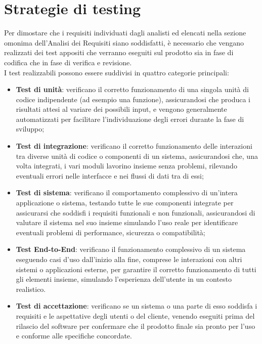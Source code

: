 \section{Strategie di testing}
Per dimostare che i requisiti individuati dagli analisti ed elencati nella sezione omonima dell'Analisi dei Requisiti siano soddisfatti, è necessario che vengano realizzati dei test appositi che verranno eseguiti sul prodotto sia in fase di codifica che in fase di verifica e revisione.\\
I test realizzabili possono essere suddivisi in quattro categorie principali:
\begin{itemize}
    \item \textbf{Test di unità}: verificano il corretto funzionamento di una singola unità di codice indipendente (ad esempio una funzione), assicurandosi che produca i risultati attesi al variare dei possibili input, e vengono generalmente automatizzati per facilitare l'individuazione degli errori durante la fase di sviluppo;
    \item \textbf{Test di integrazione}: verificano il corretto funzionamento delle interazioni tra diverse unità di codice o componenti di un sistema, assicurandosi che, una volta integrati, i vari moduli lavorino insieme senza problemi, rilevando eventuali errori nelle interfacce e nei flussi di dati tra di essi;
    \item \textbf{Test di sistema}: verificano il comportamento complessivo di un'intera applicazione o sistema, testando tutte le sue componenti integrate per assicurarsi che soddisfi i requisiti funzionali e non funzionali, assicurandosi di valutare il sistema nel suo insieme simulando l'uso reale per identificare eventuali problemi di performance, sicurezza o compatibilità;
    \item \textbf{Test End-to-End}: verificano il funzionamento complessivo di un sistema eseguendo casi d'uso dall'inizio alla fine, comprese le interazioni con altri sistemi o applicazioni esterne, per garantire il corretto funzionamento di tutti gli elementi insieme, simulando l'esperienza dell'utente in un contesto realistico.
    \item \textbf{Test di accettazione}: verificano se un sistema o una parte di esso soddisfa i requisiti e le aspettative degli utenti o del cliente, venendo eseguiti prima del rilascio del software per confermare che il prodotto finale sia pronto per l'uso e conforme alle specifiche concordate.
\end{itemize}

